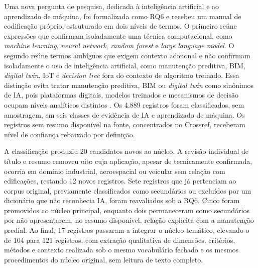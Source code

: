 Uma nova pergunta de pesquisa, dedicada à inteligência artificial e ao aprendizado de máquina, foi formalizada como RQ6 e recebeu um manual de codificação próprio, estruturado em dois níveis de termos. O primeiro reúne expressões que confirmam isoladamente uma técnica computacional, como \textit{machine learning}, \textit{neural network}, \textit{random forest} e \textit{large language model}. O segundo reúne termos ambíguos que exigem contexto adicional e não confirmam isoladamente o uso de inteligência artificial, como manutenção preditiva, BIM, \textit{digital twin}, IoT e \textit{decision tree} fora do contexto de algoritmo treinado. Essa distinção evita tratar manutenção preditiva, BIM ou \textit{digital twin} como sinônimos de IA, pois plataformas digitais, modelos treinados e mecanismos de decisão ocupam níveis analíticos distintos \parencite{deng_bimdigitaltwins_2021,das_iotai_2025}. Os 4.889 registros foram classificados, sem amostragem, em seis classes de evidência de IA e aprendizado de máquina. Os registros sem resumo disponível na fonte, concentrados no Crossref, receberam nível de confiança rebaixado por definição.

A classificação produziu 20 candidatos novos ao núcleo. A revisão individual de título e resumo removeu oito cuja aplicação, apesar de tecnicamente confirmada, ocorria em domínio industrial, aeroespacial ou veicular sem relação com edificações, restando 12 novos registros. Sete registros que já pertenciam ao corpus original, previamente classificados como secundários ou excluídos por um dicionário que não reconhecia IA, foram reavaliados sob a RQ6. Cinco foram promovidos ao núcleo principal, enquanto dois permaneceram como secundários por não apresentarem, no resumo disponível, relação explícita com a manutenção predial. Ao final, 17 registros passaram a integrar o núcleo temático, elevando-o de 104 para 121 registros, com extração qualitativa de dimensões, critérios, métodos e contexto realizada sob o mesmo vocabulário fechado e os mesmos procedimentos do núcleo original, sem leitura de texto completo.
